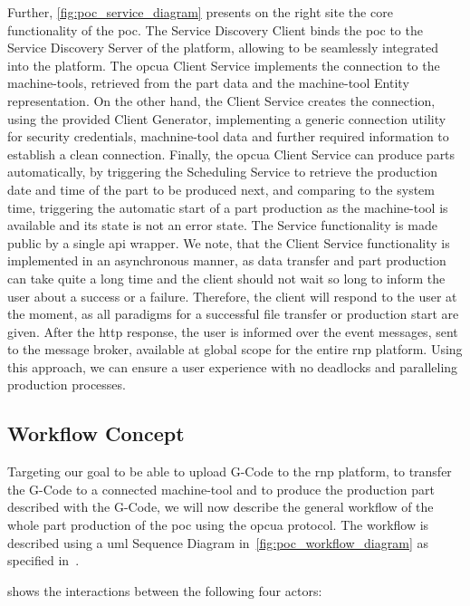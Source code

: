 \documentclass[
a4paper,
twoside,
headsepline,
cleardoublepage=empty,
parskip=half,
draft=false
]{scrbook}
\begin{document}
				Further, \cref{fig:poc_service_diagram} presents on the right site the core functionality of the \gls{poc}.
				The Service Discovery Client binds the \gls{poc} to the Service Discovery Server of the platform, allowing to be seamlessly integrated into the platform.
				The \gls{opcua} Client Service implements the connection to the machine-tools, retrieved from the part data and the machine-tool Entity representation.
				On the other hand, the Client Service creates the connection, using the provided Client Generator, implementing a generic connection utility for security credentials, machnine-tool data and further required information to establish a clean connection. Finally, the \gls{opcua} Client Service can produce parts automatically, by triggering the Scheduling Service to retrieve the production date and time of the part to be produced next, and comparing to the system time, triggering the automatic start of a part production as the machine-tool is available and its state is not an error state.
				The Service functionality is made public by a single \gls{api} wrapper.
				We note, that the Client Service functionality is implemented in an asynchronous manner, as data transfer and part production can take quite a long time and the client should not wait so long to inform the user about a success or a failure. Therefore, the client will respond to the user at the moment, as all paradigms for a successful file transfer or production start are given. After the \gls{http} response, the user is informed over the event messages, sent to the message broker, available at global scope for the entire \gls{rnp} platform. Using this approach, we can ensure a user experience with no deadlocks and paralleling production processes.

			\subsection{Workflow Concept} \label{subsec:workflow_concept}

				Targeting our goal to be able to upload G-Code to the \gls{rnp} platform, to transfer the G-Code to a connected machine-tool and to produce the production part described with the G-Code, we will now describe the general workflow of the whole part production of the \gls{poc} using the \gls{opcua} protocol. The workflow is described using a \gls{uml} Sequence Diagram in~\cref{fig:poc_workflow_diagram} as specified in~\cite{uml2017}.
				
				 shows the interactions between the following four actors:
				
\end{document}
